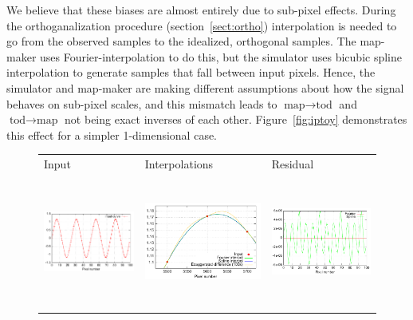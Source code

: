 \documentclass{article}
\begin{document}
We believe that these biases are almost entirely due to sub-pixel effects.
During the orthoganalization procedure (section~\ref{sect:ortho})
interpolation is needed to go from the observed samples to the
idealized, orthogonal samples. The map-maker uses Fourier-interpolation
to do this, but the simulator uses bicubic spline interpolation to
generate samples that fall between input pixels. Hence, the
simulator and map-maker are making different assumptions about how
the signal behaves on sub-pixel scales, and this mismatch leads
to $\textrm{map}\rightarrow\textrm{tod}$ and $\textrm{tod}\rightarrow
\textrm{map}$ not being exact inverses of each other. Figure~\ref{fig:iptoy}
demonstrates this effect for a simpler 1-dimensional case.
\begin{figure}[h!]
	\centering
	\hspace*{-13mm}\begin{tabular}{m{59mm}m{59mm}m{59mm}}
		\hspace{30mm}Input & \hspace{20mm}Interpolations & \hspace{30mm}Residual \\
		\includegraphics[height=43mm,clip,trim=0 0 0 0]{plots/subpixel_model_input.pdf} &
		\includegraphics[height=43mm,clip,trim=0 0 0 0]{plots/subpixel_model_interpol.pdf} &
		\includegraphics[height=43mm,clip,trim=0 0 0 0]{plots/subpixel_model_residual.pdf}

\end{tabular}
\end{figure}
\end{document}

